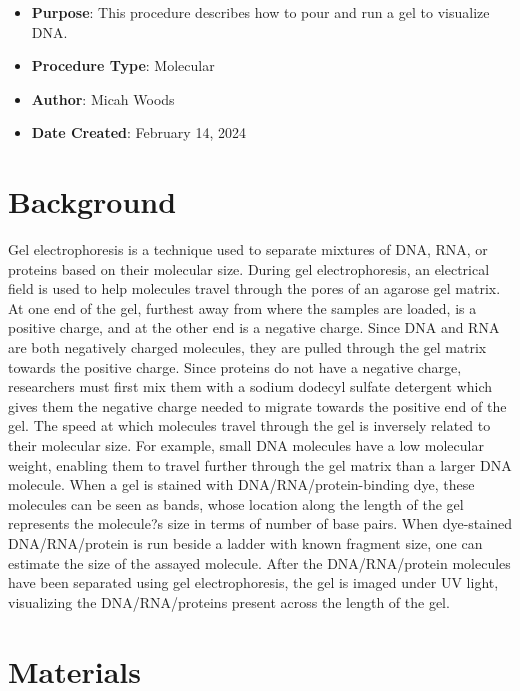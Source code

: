 \documentclass[
  letterpaper,
  DIV=11,
  numbers=noendperiod]{scrreprt}
\providecommand{\tightlist}{%
  \setlength{\itemsep}{0pt}\setlength{\parskip}{0pt}}\usepackage{longtable,booktabs,array}
\begin{document}
\begin{itemize}
\tightlist
\item
  \textbf{Purpose}: This procedure describes how to pour and run a gel
  to visualize DNA.
\item
  \textbf{Procedure Type}: Molecular
\item
  \textbf{Author}: Micah Woods
\item
  \textbf{Date Created}: February 14, 2024
\end{itemize}

\hypertarget{background}{%
\section{Background}\label{background}}

Gel electrophoresis is a technique used to separate mixtures of DNA,
RNA, or proteins based on their molecular size. During gel
electrophoresis, an electrical field is used to help molecules travel
through the pores of an agarose gel matrix. At one end of the gel,
furthest away from where the samples are loaded, is a positive charge,
and at the other end is a negative charge. Since DNA and RNA are both
negatively charged molecules, they are pulled through the gel matrix
towards the positive charge. Since proteins do not have a negative
charge, researchers must first mix them with a sodium dodecyl sulfate
detergent which gives them the negative charge needed to migrate towards
the positive end of the gel. The speed at which molecules travel through
the gel is inversely related to their molecular size. For example, small
DNA molecules have a low molecular weight, enabling them to travel
further through the gel matrix than a larger DNA molecule. When a gel is
stained with DNA/RNA/protein-binding dye, these molecules can be seen as
bands, whose location along the length of the gel represents the
molecule?s size in terms of number of base pairs. When dye-stained
DNA/RNA/protein is run beside a ladder with known fragment size, one can
estimate the size of the assayed molecule. After the DNA/RNA/protein
molecules have been separated using gel electrophoresis, the gel is
imaged under UV light, visualizing the DNA/RNA/proteins present across
the length of the gel.

\hypertarget{materials-16}{%
\section{Materials}\label{materials-16}}
\end{document}
